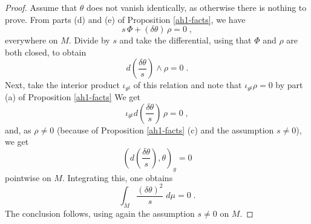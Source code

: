 \documentclass[10pt,a4paper]{amsart}
\begin{document}
\begin{proof}
   Assume that $\theta$ does not vanish identically, as otherwise there is nothing to prove. From parts (d) and (e) of Proposition \ref{ah1-facts}, we have
$$ s \, \Phi + (\delta \theta) \, \rho = 0 \; ,$$    
everywhere on $M$. Divide by $s$ and take the differential, using that $\Phi$ and $\rho$ are both closed, to obtain
%
%
%
%
$$ d \left( \frac{\delta \theta}{s} \right) \wedge \rho = 0\; . $$
Next, take the interior product $\iota_{\theta^{\sharp}}$ of this relation and note that $\iota_{\theta^{\sharp}} \rho  =0$ by part (a) of Proposition \ref{ah1-facts}
We get 
$$ \iota_{\theta^{\sharp}} d \left( \frac{\delta \theta}{s} \right) \,\rho = 0\; ,$$
and, as $\rho \neq 0$ (because of Proposition \ref{ah1-facts} (c) and the assumption $s \neq 0$), we get 
$$ \left( d \left( \frac{\delta \theta}{s} \right), \theta \right)_g = 0 $$
pointwise on $M$. Integrating this, one obtains
$$\int_M \frac{(\delta \theta)^2}{s} \; d\mu = 0 \; . $$
The conclusion follows, using again the assumption $s \neq 0$ on $M$.
\end{proof}
\end{document}
